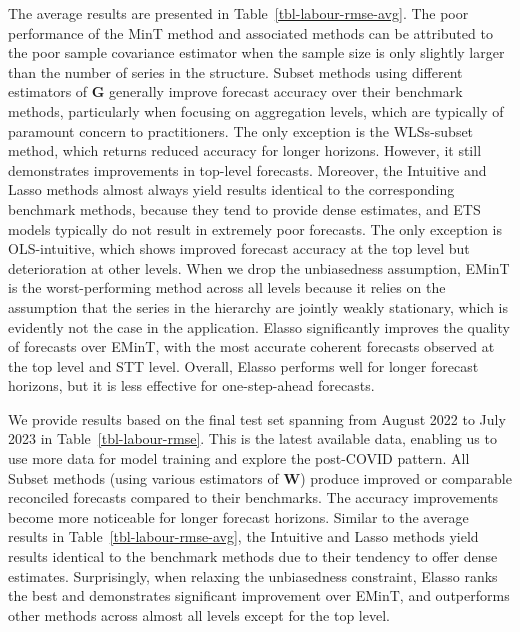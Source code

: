 \documentclass[
  11pt]{article}
\begin{document}
The average results are presented in Table~\ref{tbl-labour-rmse-avg}.
The poor performance of the MinT method and associated methods can be
attributed to the poor sample covariance estimator when the sample size
is only slightly larger than the number of series in the structure.
Subset methods using different estimators of \(\bm{G}\) generally
improve forecast accuracy over their benchmark methods, particularly
when focusing on aggregation levels, which are typically of paramount
concern to practitioners. The only exception is the WLSs-subset method,
which returns reduced accuracy for longer horizons. However, it still
demonstrates improvements in top-level forecasts. Moreover, the
Intuitive and Lasso methods almost always yield results identical to the
corresponding benchmark methods, because they tend to provide dense
estimates, and ETS models typically do not result in extremely poor
forecasts. The only exception is OLS-intuitive, which shows improved
forecast accuracy at the top level but deterioration at other levels.
When we drop the unbiasedness assumption, EMinT is the worst-performing
method across all levels because it relies on the assumption that the
series in the hierarchy are jointly weakly stationary, which is
evidently not the case in the application. Elasso significantly improves
the quality of forecasts over EMinT, with the most accurate coherent
forecasts observed at the top level and STT level. Overall, Elasso
performs well for longer forecast horizons, but it is less effective for
one-step-ahead forecasts.

We provide results based on the final test set spanning from August 2022
to July 2023 in Table~\ref{tbl-labour-rmse}. This is the latest
available data, enabling us to use more data for model training and
explore the post-COVID pattern. All Subset methods (using various
estimators of \(\bm{W}\)) produce improved or comparable reconciled
forecasts compared to their benchmarks. The accuracy improvements become
more noticeable for longer forecast horizons. Similar to the average
results in Table~\ref{tbl-labour-rmse-avg}, the Intuitive and Lasso
methods yield results identical to the benchmark methods due to their
tendency to offer dense estimates. Surprisingly, when relaxing the
unbiasedness constraint, Elasso ranks the best and demonstrates
significant improvement over EMinT, and outperforms other methods across
almost all levels except for the top level.
\end{document}
